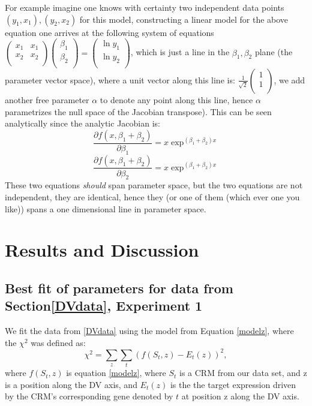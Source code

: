 For example imagine one knows with certainty two independent data points $(y_1, x_1), (y_2,x_2)$ for this model, constructing a linear model for the above equation one arrives at the following system of equations $\begin{pmatrix}  x_1&x_1\\ x_2 & x_2\\ \end{pmatrix} \begin{pmatrix} \beta_1\\ \beta_2 \\ \end{pmatrix} = \begin{pmatrix} \ln{y_1}\\ \ln{y_2} \\ \end{pmatrix} $, which is just a line in the $\beta_1,\beta_2$ plane (the parameter vector space), where a unit vector along this line is: $\frac{1}{\sqrt{2}}\begin{pmatrix} 1\\ 1\\ \end{pmatrix} $, we add another free parameter $\alpha$ to denote any point along this line, hence $\alpha$ parametrizes the null space of the Jacobian transpose).  This can be seen analytically since the analytic Jacobian is:
\begin{equation}
\frac{\partial{f(x,\beta_1+\beta_2)}}{\partial \beta_1} = x \exp^{(\beta_1 +\beta_2)x}
\end{equation}
\begin{equation}
\frac{\partial{f(x,\beta_1+\beta_2)}}{\partial \beta_2} = x \exp^{(\beta_1 +\beta_2)x}
\end{equation}
These two equations \emph{should} span parameter space, but the two equations are not independent, they are identical, hence they (or one of them (which ever one you like)) spans a one dimensional line in parameter space.
\section{Results and Discussion}
\subsection{Best fit of parameters for data from Section\ref{DVdata}, Experiment 1}

We fit the data from \ref{DVdata} using the model from Equation \ref{modelz}, where the $\chi^2$ was defined as:
\begin{equation}\label{chi2}
\chi^2 = \sum_z \sum_t (f(S_t,z) - E_t(z) )^2,
\end{equation}
where $f(S_t,z)$ is equation \ref{modelz}, where $S_t$ is a CRM from our data set, and z is a position along the DV axis, and $E_t(z)$ is the the  target expression driven by the CRM's corresponding gene denoted by $t$ at position z along the DV axis. 


